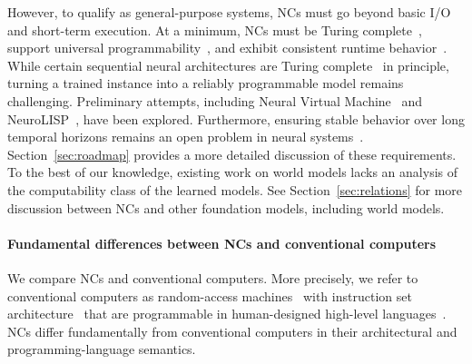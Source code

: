 However, to qualify as general-purpose systems, NCs must go beyond basic I/O and short-term execution. 
At a minimum, NCs must be Turing complete~\citep{turing1936computable,siegelmann1992computational}, support universal programmability~\citep{von1993first,wilkes1981best}, and exhibit consistent runtime behavior~\citep{queloz2025explainability}. 
While certain sequential neural architectures are Turing complete~\citep{siegelmann1992computational,perez2021attention} in principle, turning a trained instance into a reliably programmable model remains challenging.
Preliminary attempts, including Neural Virtual Machine~\citep{katz2019programmable} and NeuroLISP~\citep{davis2022neurolisp}, have been explored.
Furthermore, ensuring stable behavior over long temporal horizons remains an open problem in neural systems~\citep{kirkpatrick2017overcoming,calanzonelogically}. 
Section~\ref{sec:roadmap} provides a more detailed discussion of these requirements. 
To the best of our knowledge, existing work on world models lacks an analysis of the computability class of the learned models.
See Section~\ref{sec:relations} for more discussion between NCs and other foundation models, including world models.

\paragraph{Fundamental differences between NCs and conventional computers}
We compare NCs and conventional computers.
More precisely, we refer to conventional computers as random-access machines~\citep{hartmanis1974power}
with instruction set architecture~\citep{anagnostopoulos1973computer}
that are programmable in human-designed high-level languages~\citep{backus1957fortran,backus1963revised}.
NCs differ fundamentally from conventional computers in their architectural and programming-language semantics.

